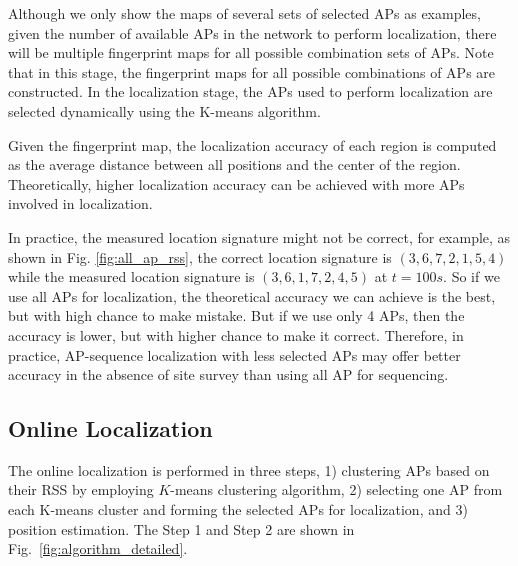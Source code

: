 \documentclass[10pt, conference, letterpaper]{IEEEtran}
\begin{document}
Although we only show the maps of several sets of selected APs as examples, 
given the number of available APs in the network to perform localization, there will be multiple fingerprint maps for all possible combination sets of APs. 
Note that in this stage, the fingerprint maps for all possible combinations of APs are constructed. 
In the localization stage, the APs used to perform localization are selected dynamically using the K-means algorithm.

Given the fingerprint map, the localization accuracy of each region is computed as the average distance between all positions and the center of the region. 
Theoretically, higher localization accuracy can be achieved with more APs involved in localization. 

In practice, the measured location signature might not be correct, 
for example, as shown in Fig. \ref{fig:all_ap_rss}, the correct location signature is $(3,6,7,2,1,5,4)$ while the measured location signature is $(3,6,1,7,2,4,5)$ at $t=100s$. 
So if we use all APs for localization, the theoretical accuracy we can achieve is the best, but with high chance to make mistake. 
But if we use only 4 APs, then the accuracy is lower, but with higher chance to make it correct. 
Therefore, in practice, AP-sequence localization with less selected APs may offer better accuracy in the absence of site survey than using all AP for sequencing. 

\subsection{Online Localization}
\label{subsection:online_localization}
The online localization is performed in three steps, 
1) clustering APs based on their RSS by employing $K$-means clustering algorithm, 
2) selecting one AP from each K-means cluster and forming the selected APs for localization, 
and 3) position estimation. The Step 1 and Step 2 are shown in Fig.~\ref{fig:algorithm_detailed}.
\end{document}
